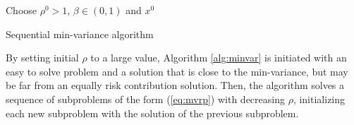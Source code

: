 {\begin{algorithm}
Choose $\rho^0 > 1$, $\beta \in (0,1)$ and $x^0 $\\
\caption{Sequential min-variance algorithm}
\label{alg:minvar}
\end{algorithm}


By setting initial $\rho$ to a large value, Algorithm \ref{alg:minvar} is initiated with an easy to solve problem and a solution that is close to the min-variance, but may be far from an equally risk contribution solution. Then, the algorithm solves a sequence of subproblems of the form (\ref{eq:mvrp}) with decreasing $\rho$, initializing each new subproblem with the solution of the previous subproblem.

}
